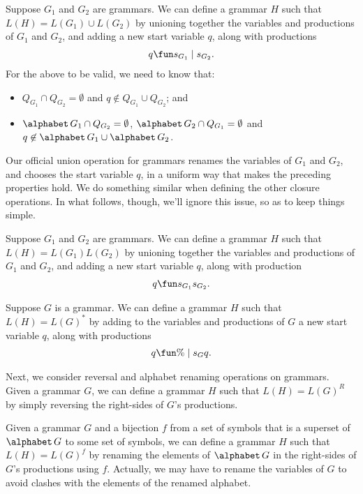 Suppose $G_1$ and $G_2$ are grammars.  We can define a grammar $H$
such that $L(H)=L(G_1)\cup L(G_2)$ by unioning together the variables
and productions of $G_1$ and $G_2$, and adding a new start variable
$q$, along with productions
\begin{gather*}
  q\fun s_{G_1}\mid s_{G_2} .
\end{gather*}
For the above to be valid, we need to know that:
\begin{itemize}
\item $Q_{G_1}\cap Q_{G_2}=\emptyset$ and
$q\not\in Q_{G_1}\cup Q_{G_2}$; and

\item $\alphabet\,G_1\cap Q_{G_2}=\emptyset$,
$\alphabet\,G_2\cap Q_{G_1}=\emptyset$ and
$q\not\in\alphabet\,G_1\cup\alphabet\,G_2$.
\end{itemize}
Our official union operation for grammars renames the variables
of $G_1$ and $G_2$, and chooses the start variable $q$,
in a uniform way that makes the preceding properties hold.
We do something similar when defining the other closure
operations.  In what follows, though, we'll ignore this issue,
so as to keep things simple.

Suppose $G_1$ and $G_2$ are grammars.  We can define a grammar $H$
such that $L(H)=L(G_1)L(G_2)$ by unioning together the variables and
productions of $G_1$ and $G_2$, and adding a new start variable $q$,
along with production
\begin{gather*}
  q\fun s_{G_1}s_{G_2} .
\end{gather*}

Suppose $G$ is a grammar.  We can define a grammar $H$ such that
$L(H)=L(G)^*$ by adding to the variables and productions of $G$ a new
start variable $q$, along with productions
\begin{gather*}
q\fun \%\mid s_Gq .
\end{gather*}

Next, we consider reversal and alphabet renaming operations on
grammars.  Given a grammar $G$, we can define a grammar $H$ such that
%
%
%
%
$L(H)=L(G)^R$ by simply reversing the right-sides of $G$'s
productions.

Given a grammar $G$ and a bijection $f$ from a set of symbols that is
a superset of $\alphabet\,G$ to some set of symbols, we can define a
grammar $H$ such that $L(H)=L(G)^f$ by renaming the elements of
%
%
%
%
$\alphabet\,G$ in the right-sides of $G$'s productions using $f$.
Actually, we may have to rename the variables of $G$ to avoid clashes
with the elements of the renamed alphabet.

